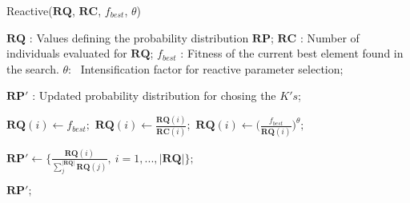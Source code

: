 \begin{breakablealgorithm}
\caption{Reactive($\bm{RQ}$, $\bm{RC}$, $f_{best}$, $\theta$)}
\label{alg:Reactive}
\begin{algorithmic}[1]


\INPUT{}
\Statex $\bm{RQ}$ : Values defining the probability distribution $\bm{RP}$;
\Statex $\bm{RC}$ : Number of individuals evaluated for $\bm{RQ}$;
\Statex $f_{best}$ : Fitness of the current best element found in the search.
\Statex $\theta$: \quad \, Intensification factor for reactive parameter selection;
\Statex

\OUTPUT{}
\Statex $\bm{RP}'$ : Updated probability distribution for chosing the $K's$;
\Statex
\Statex



\State $\bm{RQ}(i) \gets f_{best};$
\Else
\State $\bm{RQ}(i) \gets \frac{\bm{RQ}(i)}{\bm{RC}(i)};$
\EndIf
\Statex
\State $\bm{RQ}(i) \gets \Big( \frac{f_{best}}{\bm{RQ}(i)} \Big)^{\theta};$
\EndFor
\Statex

\State $\bm{RP}' \gets \{\frac{\bm{RQ}(i)}{\sum_j^{|\bm{RQ}|} \bm{RQ}(j)}, \ i = 1, ..., |\bm{RQ}|\};$
\Statex


\State \Return $\bm{RP}';$


\end{algorithmic}
\end{breakablealgorithm}